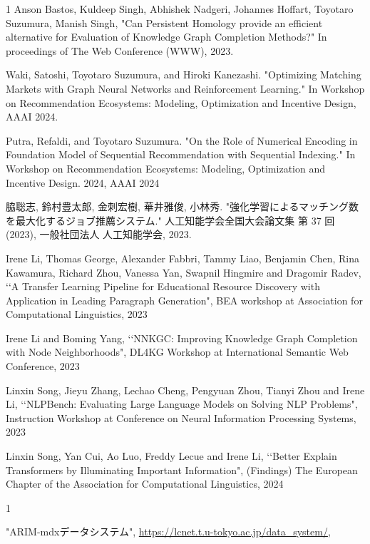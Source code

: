 \begin{査読付}{1}
Anson Bastos, Kuldeep Singh, Abhishek Nadgeri, Johannes Hoffart, Toyotaro Suzumura, Manish Singh,
"Can Persistent Homology provide an efficient alternative for Evaluation of Knowledge Graph Completion Methods?"
In proceedings of The Web Conference (WWW), 2023.

Waki, Satoshi, Toyotaro Suzumura, and Hiroki Kanezashi. "Optimizing Matching Markets with Graph Neural Networks and Reinforcement Learning." In Workshop on Recommendation Ecosystems: Modeling, Optimization and Incentive Design, AAAI 2024.

Putra, Refaldi, and Toyotaro Suzumura. "On the Role of Numerical Encoding in Foundation Model of Sequential Recommendation with Sequential Indexing." In Workshop on Recommendation Ecosystems: Modeling, Optimization and Incentive Design. 2024, AAAI 2024


脇聡志, 鈴村豊太郎, 金刺宏樹, 華井雅俊, 小林秀. "強化学習によるマッチング数を最大化するジョブ推薦システム." 人工知能学会全国大会論文集 第 37 回 (2023), 一般社団法人 人工知能学会, 2023.


Irene Li, Thomas George, Alexander Fabbri, Tammy Liao, Benjamin Chen, Rina Kawamura, Richard Zhou, Vanessa Yan, Swapnil Hingmire and Dragomir Radev, \lq\lq A Transfer Learning Pipeline for Educational Resource Discovery with Application in Leading Paragraph Generation", BEA workshop at Association for Computational Linguistics, 2023

Irene Li and Boming Yang, \lq\lq NNKGC: Improving Knowledge Graph Completion with Node Neighborhoods", DL4KG Workshop at International Semantic Web Conference, 2023

Linxin Song, Jieyu Zhang, Lechao Cheng, Pengyuan Zhou, Tianyi Zhou and Irene Li, \lq\lq NLPBench: Evaluating Large Language Models on Solving NLP Problems", Instruction Workshop at Conference on Neural Information Processing Systems, 2023


Linxin Song, Yan Cui, Ao Luo, Freddy Lecue and Irene Li, \lq\lq Better Explain Transformers by Illuminating Important Information", (Findings) The European Chapter of the Association for Computational Linguistics, 2024

\end{査読付}

\begin{公開}{1}


"ARIM-mdxデータシステム",
\url{https://lcnet.t.u-tokyo.ac.jp/data_system/},

\end{公開}

